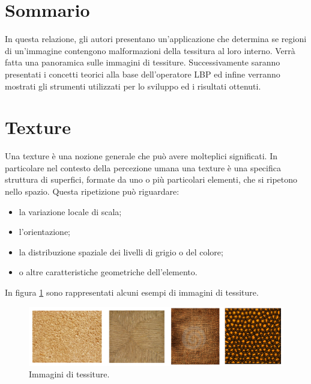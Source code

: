 \section*{Sommario}
In questa relazione, gli autori presentano un'applicazione che determina se regioni di un'immagine contengono malformazioni della tessitura al loro interno.
Verrà fatta una panoramica sulle immagini di tessiture. Successivamente saranno presentati i concetti teorici alla base dell'operatore \acf{LBP} ed infine verranno mostrati gli strumenti utilizzati per lo sviluppo ed i risultati ottenuti.


\newpage
\null 
\thispagestyle{empty}
\newpage


\section{Texture}

Una texture è una nozione generale che può avere molteplici significati. In particolare nel contesto della percezione umana una texture è una specifica struttura di superfici, formate da uno o più particolari elementi, che si ripetono nello spazio.
Questa ripetizione può riguardare:

\begin{itemize}
	\item la variazione locale di scala;
	\item l'orientazione;
	\item la distribuzione spaziale dei livelli di grigio o del colore\cite{Stockman:2001:CV:558008};
	\item o altre caratteristiche geometriche dell'elemento.
\end{itemize}

\noindent In figura \ref{fig:Texture} sono rappresentati alcuni esempi di immagini di tessiture. \\

\begin{figure}[ht]
\begin{center}
\includegraphics[width=.95\textwidth]{img/Texture}
\caption{ Immagini di tessiture.}
\label{fig:Texture}
\end{center}
\end{figure}


